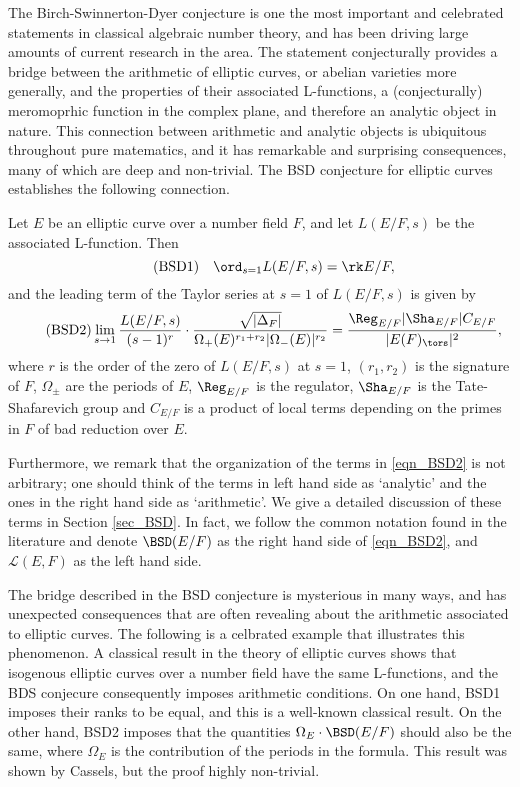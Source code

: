 The Birch-Swinnerton-Dyer conjecture is one the most important and celebrated statements in classical algebraic number theory, and has been driving large amounts of current research in the area. The statement conjecturally provides a bridge between the arithmetic of elliptic curves, or abelian varieties more generally, and the properties of their associated L-functions, a (conjecturally) meromoprhic function in the complex plane, and therefore an analytic object in nature. This connection between arithmetic and analytic objects is ubiquitous throughout pure matematics, and it has remarkable and surprising consequences, many of which are deep and non-trivial. The BSD conjecture for elliptic curves establishes the following connection.

\begin{conj}
    Let $E$ be an elliptic curve over a number field $F$, and let $L(E/F,s)$ be the associated L-function. Then
    \begin{equation}\label{eqn_BSD1}\tag{BSD1}
        \quad\ord_{s=1}L(E/F,s)=\rk E/F,
    \end{equation}
    and the leading term of the Taylor series at $s=1$ of $L(E/F,s)$ is given by
    \begin{equation}\label{eqn_BSD2}\tag{BSD2}
        \lim_{s\to1}\frac{L(E/F,s)}{(s-1)^r}\cdot\frac{\sqrt{|\Delta_F|}}{\Omega_+(E)^{r_1+r_2}|\Omega_-(E)|^{r_2}}=\frac{\Reg_{E/F}|\Sha_{E/F}|C_{E/F}}{|E(F)_{\tors}|^2},
    \end{equation}
    where $r$ is the order of the zero of $L(E/F,s)$ at $s=1$, $(r_1,r_2)$ is the signature of $F$, $\Omega_{\pm}$ are the periods of $E$, $\Reg_{E/F}$ is the regulator, $\Sha_{E/F}$ is the Tate-Shafarevich group and $C_{E/F}$ is a product of local terms depending on the primes in $F$ of bad reduction over $E$.
\end{conj}

Furthermore, we remark that the organization of the terms in \eqref{eqn_BSD2} is not arbitrary; one should think of the terms in left hand side as `analytic' and the ones in the right hand side as `arithmetic'. We give a detailed discussion of these terms in Section \ref{sec_BSD}. In fact, we follow the common notation found in the literature and denote $\BSD(E/F)$ as the right hand side of \eqref{eqn_BSD2}, and $\mathcal{L}(E,F)$ as the left hand side.

The bridge described in the BSD conjecture is mysterious in many ways, and has unexpected consequences that are often revealing about the arithmetic associated to elliptic curves. The following is a celbrated example that illustrates this phenomenon. A classical result in the theory of elliptic curves shows that isogenous elliptic curves over a number field have the same L-functions, and the BDS conjecure consequently imposes arithmetic conditions. On one hand, BSD1 imposes their ranks to be equal, and this is a well-known classical result. On the other hand, BSD2 imposes that the quantities $\Omega_E\cdot\BSD(E/F)$ should also be the same, where $\Omega_E$ is the contribution of the periods in the formula. This result was shown by Cassels, but the proof highly non-trivial. 

